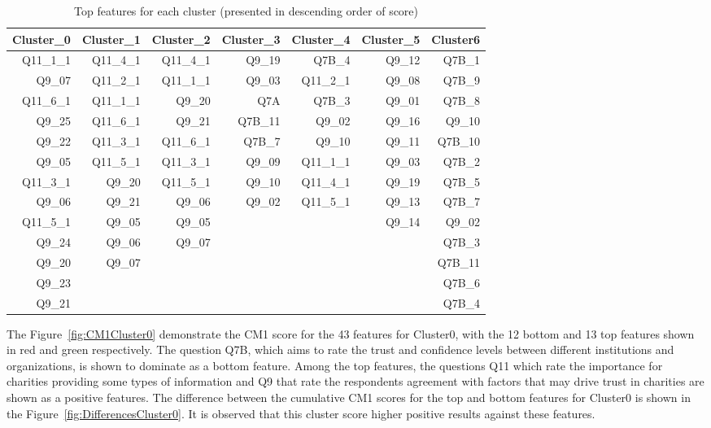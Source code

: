 \documentclass{article}
\begin{document}
\begin{table}[htbp]
  \centering
  \caption{Top features for each cluster (presented in descending order of
  score)}
    \begin{tabular}{rrrrrrr}
    \toprule
    Cluster\_0 & Cluster\_1 & Cluster\_2 & Cluster\_3 & Cluster\_4 & Cluster\_5 & Cluster6 \\
    \midrule
    Q11\_1\_1 & Q11\_4\_1 & Q11\_4\_1 & Q9\_19 & Q7B\_4 & Q9\_12 & Q7B\_1 \\
    Q9\_07 & Q11\_2\_1 & Q11\_1\_1 & Q9\_03 & Q11\_2\_1 & Q9\_08 & Q7B\_9 \\
    Q11\_6\_1 & Q11\_1\_1 & Q9\_20 & Q7A   & Q7B\_3 & Q9\_01 & Q7B\_8 \\
    Q9\_25 & Q11\_6\_1 & Q9\_21 & Q7B\_11 & Q9\_02 & Q9\_16 & Q9\_10 \\
    Q9\_22 & Q11\_3\_1 & Q11\_6\_1 & Q7B\_7 & Q9\_10 & Q9\_11 & Q7B\_10 \\
    Q9\_05 & Q11\_5\_1 & Q11\_3\_1 & Q9\_09 & Q11\_1\_1 & Q9\_03 & Q7B\_2 \\
    Q11\_3\_1 & Q9\_20 & Q11\_5\_1 & Q9\_10 & Q11\_4\_1 & Q9\_19 & Q7B\_5 \\
    Q9\_06 & Q9\_21 & Q9\_06 & Q9\_02 & Q11\_5\_1 & Q9\_13 & Q7B\_7 \\
    Q11\_5\_1 & Q9\_05 & Q9\_05 &       &       & Q9\_14 & Q9\_02 \\
    Q9\_24 & Q9\_06 & Q9\_07 &       &       &       & Q7B\_3 \\
    Q9\_20 & Q9\_07 &       &       &       &       & Q7B\_11 \\
    Q9\_23 &       &       &       &       &       & Q7B\_6 \\
    Q9\_21 &       &       &       &       &       & Q7B\_4 \\
    \bottomrule
    \end{tabular}
  \label{tab:top}
\end{table}




The Figure~\ref{fig:CM1Cluster0} demonstrate the CM1 score for the 43 features
for Cluster0, with the 12 bottom and 13 top features shown in red and green
respectively. The question Q7B, which aims to rate the trust and confidence
levels between different institutions and organizations, is shown to dominate as
a bottom feature. Among the top features, the questions Q11 which rate the
importance for charities providing some types of information and Q9 that rate
the respondents agreement with factors that may drive trust in charities are
shown as a positive features. The difference between the cumulative CM1 scores
for the top and bottom features for Cluster0 is shown in the
Figure~\ref{fig:DifferencesCluster0}. It is observed that this cluster score
higher positive results against these features.
\end{document}
